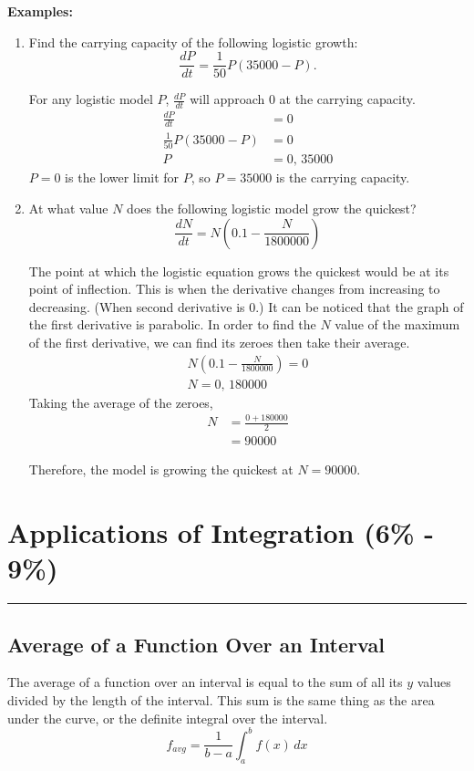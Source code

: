 \documentclass[12pt]{article}
\newcommand{\fline}{\par\noindent\rule{\textwidth}{0.1pt}} %
\begin{document}
\noindent \textbf{Examples:}
\begin{enumerate}
    \item Find the carrying capacity of the following logistic growth:
          \[ \frac{dP}{dt} = \frac{1}{50} P (35000 - P). \]

          For any logistic model $P$, $\frac{dP}{dt}$ will approach $0$ at the carrying capacity.
          \begin{align*}
              \frac{dP}{dt}              & = 0           \\[6pt]
              \frac{1}{50} P (35000 - P) & = 0           \\[6pt]
              P                          & = 0, \, 35000
          \end{align*}
          $P=0$ is the lower limit for $P$, so $P=35000$ is the carrying capacity.
          \bigskip

    \item At what value $N$ does the following logistic model grow the quickest?
          \[ \frac{dN}{dt} = N \left( 0.1 - \frac{N}{1800000} \right) \]

          The point at which the logistic equation grows the quickest would be at its point of inflection. This is when the derivative changes from increasing to decreasing. (When second derivative is $0$.) It can be noticed that the graph of the first derivative is parabolic. In order to find the $N$ value of the maximum of the first derivative, we can find its zeroes then take their average.
          \begin{gather*}
              N \left( 0.1 - \frac{N}{1800000} \right) = 0 \\[6pt]
              N = 0, \, 180000
          \end{gather*}
          Taking the average of the zeroes,
          \begin{align*}
              N & = \frac{0 + 180000}{2} \\[6pt]
                & = 90000
          \end{align*}

          Therefore, the model is growing the quickest at $N=90000$.
\end{enumerate}

\section{Applications of Integration (6\% - 9\%)}
\fline

\subsection{Average of a Function Over an Interval} %
The average of a function over an interval is equal to the sum of all its $y$ values divided by the length of the interval. This sum is the same thing as the area under the curve, or the definite integral over the interval.
\[ f_{avg} = \frac{1}{b-a} \int_{a}^{b} f(x) \, dx \]
\end{document}
